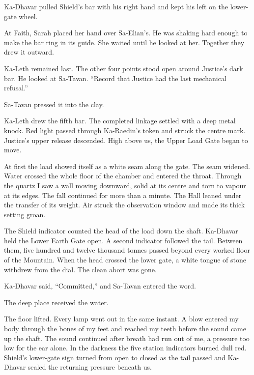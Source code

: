 Ka-Dhavar pulled Shield's bar with his right hand and kept his left on the lower-gate wheel.\par

At Faith, Sarah placed her hand over Sa-Elian's. He was shaking hard enough to make the bar ring in its guide. She waited until he looked at her. Together they drew it outward.\par

Ka-Leth remained last. The other four points stood open around Justice's dark bar. He looked at Sa-Tavan. ``Record that Justice had the last mechanical refusal.''\par

Sa-Tavan pressed it into the clay.\par

Ka-Leth drew the fifth bar. The completed linkage settled with a deep metal knock. Red light passed through Ka-Raedin's token and struck the centre mark. Justice's upper release descended. High above us, the Upper Load Gate began to move.\par

At first the load showed itself as a white seam along the gate. The seam widened. Water crossed the whole floor of the chamber and entered the throat. Through the quartz I saw a wall moving downward, solid at its centre and torn to vapour at its edges. The fall continued for more than a minute. The Hall leaned under the transfer of its weight. Air struck the observation window and made its thick setting groan.\par

The Shield indicator counted the head of the load down the shaft. Ka-Dhavar held the Lower Earth Gate open. A second indicator followed the tail. Between them, five hundred and twelve thousand tonnes passed beyond every worked floor of the Mountain. When the head crossed the lower gate, a white tongue of stone withdrew from the dial. The clean abort was gone.\par

Ka-Dhavar said, ``Committed,'' and Sa-Tavan entered the word.\par

The deep place received the water.\par

The floor lifted. Every lamp went out in the same instant. A blow entered my body through the bones of my feet and reached my teeth before the sound came up the shaft. The sound continued after breath had run out of me, a pressure too low for the ear alone. In the darkness the five station indicators burned dull red. Shield's lower-gate sign turned from open to closed as the tail passed and Ka-Dhavar sealed the returning pressure beneath us.\par

